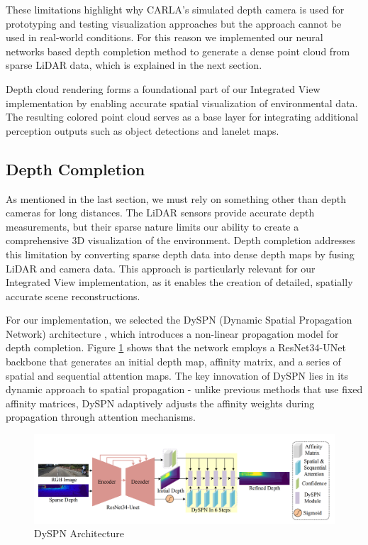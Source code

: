 These limitations highlight why CARLA's simulated depth camera is used for prototyping and testing visualization approaches but the approach cannot be used in real-world conditions.
For this reason we implemented our neural networks based depth completion method to generate a dense point cloud from sparse LiDAR data, which is explained in the next section.

Depth cloud rendering forms a foundational part of our Integrated View implementation by enabling accurate spatial visualization of environmental data. The resulting colored point cloud serves as a base layer for integrating additional perception outputs such as object detections and lanelet maps.
\subsection{Depth Completion}
As mentioned in the last section, we must rely on something other than depth cameras for long distances. The LiDAR sensors provide accurate depth measurements, but their sparse nature limits our ability to create a comprehensive 3D visualization of the environment.
Depth completion addresses this limitation by converting sparse depth data into dense depth maps by fusing LiDAR and camera data. This approach is particularly relevant for our Integrated View implementation, as it enables the creation of detailed, spatially accurate scene reconstructions.

For our implementation, we selected the DySPN (Dynamic Spatial Propagation Network) architecture \cite{dyspn}, which introduces a non-linear propagation model for depth completion. Figure \ref{fig:dyspn_architecture} shows that the network employs a ResNet34-UNet backbone that generates an initial depth map, affinity matrix, and a series of spatial and sequential attention maps. The key innovation of DySPN lies in its dynamic approach to spatial propagation - unlike previous methods \cite{cheng2020cspn} that use fixed affinity matrices, DySPN adaptively adjusts the affinity weights during propagation through attention mechanisms.

\begin{figure}
    \centering
    \includegraphics[width=\textwidth]{figures/dyspn.png}
    \caption{DySPN Architecture}
    \label{fig:dyspn_architecture}
\end{figure}


